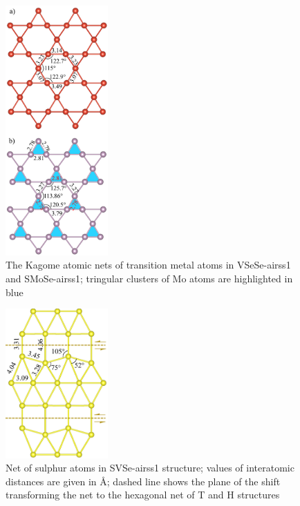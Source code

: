 \documentclass[a4paperm]{article}
\begin{document}
\begin{figure}
	\includegraphics [width=0.35\textwidth]{airss1_tm.png}
	\caption{The Kagome atomic nets of transition metal atoms in VSeSe-airss1 and SMoSe-airss1; tringular clusters of Mo atoms are highlighted in blue} 
\label{airss1_tm}
\end{figure}

\begin{figure}
	\includegraphics[width=0.35\textwidth]{airss1v_s.png}
	\caption{Net of sulphur atoms in SVSe-airss1 structure; values of interatomic distances are given in \AA; dashed line shows the plane of the shift transforming the net to the hexagonal net of T and H structures}
\label{airss1_s}
\end{figure}
\end{document}
